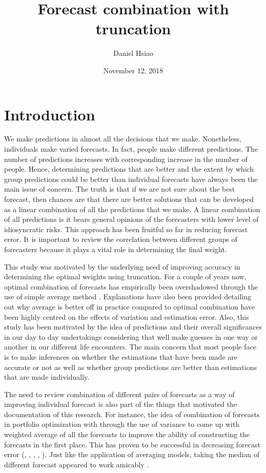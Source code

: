 \documentclass[11pt]{article}
\title{Forecast combination with truncation}
\author{Daniel Hsiao}
\date{November 12, 2018}
\begin{document}
\maketitle
\newpage
{
	\setcounter{tocdepth}{3}
	\tableofcontents
}
\newpage

\section{Introduction}\label{introduction}
We make predictions in almost all the decisions that we make. Nonetheless, individuals make varied forecasts. In fact, people make different predictions. The number of predictions increases with corresponding increase in the number of people. Hence, determining predictions that are better and the extent by which group predictions could be better than individual forecasts have always been the main issue of concern. The truth is that if we are not sure about the best forecast, then chances are that there are better solutions that can be developed as a linear combination of all the predictions that we make. A linear combination of all predictions is it bears general opinions of the forecasters with lower level of idiosyncratic risks. This approach has been fruitful so far in reducing forecast error. It is important to review the correlation between different groups of forecasters because it plays a vital role in determining the final weight.

This study was motivated by the underlying need of improving accuracy in determining the optimal weights using truncation. For a couple of years now, optimal combination of forecasts has empirically been overshadowed through the use of simple average method \citep{Bates1969}. Explanations have also been provided detailing out why average is better off in practice compared to optimal combination have been highly centred on the effects of variation and estimation error. Also, this study has been motivated by the idea of predictions and their overall significances in our day to day undertakings considering that well make guesses in one way or another in our different life encounters. The main concern that most people face is to make inferences on whether the estimations that have been made are accurate or not as well as whether group predictions are better than estimations that are made individually. 

The need to review combination of different pairs of forecasts as a way of improving individual forecast is also part of the things that motivated the documentation of this research. For instance, the idea of combination of forecasts in portfolio optimization with through the use of variance to come up with weighted average of all the forecasts to improve the ability of constructing the forecasts in the first place. This has proven to be successful in decreasing forecast error (\cite{Clemen1989}, \cite{Diebold1996}, \cite{Chen1999} , \cite{Dunis2000}, \cite{Stock2004}). Just like the application of averaging models, taking the median of different forecast appeared to work amicably \citep{Claeskens2014}.
\end{document}
